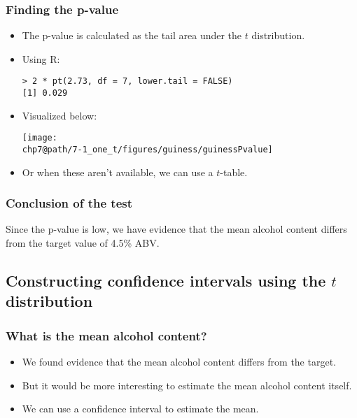 \documentclass[slidestop,compress,mathserif]{beamer}
\makeatletter
\def\chp7@path{../../Chp 7}
\makeatother
\begin{document}

\begin{frame}[fragile]
\frametitle{Finding the p-value}

\begin{itemize}
\item The p-value is calculated as the tail area under the $t$ distribution.
\pause
\item Using R:
\begin{verbatim}
> 2 * pt(2.73, df = 7, lower.tail = FALSE)
[1] 0.029
\end{verbatim}
\pause
\item Visualized below:
\begin{center}
\texttt{[image: \\chp7@path/7-1\_one\_t/figures/guiness/guinessPvalue]}
\end{center}
\pause
\item Or when these aren't available, we can use a $t$-table.
\end{itemize}
\end{frame}




\begin{frame}
\frametitle{Conclusion of the test}


\pause

Since the p-value is low, we have evidence that the mean alcohol content differs from the target value of 4.5\% ABV.

\end{frame}


\subsection{Constructing confidence intervals using the \texorpdfstring{$t$}{t} distribution}



\begin{frame}
\frametitle{What is the mean alcohol content?}

\begin{itemize}
\item We found evidence that the mean alcohol content differs from the target.
\pause
\item But it would be more interesting to estimate the mean alcohol content itself.
\pause
\item We can use a confidence interval to estimate the mean.
\end{itemize}
\end{frame}
\end{document}
